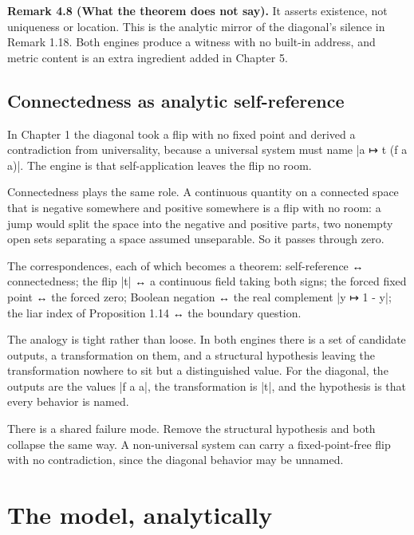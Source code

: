 \documentclass{memoir}
\begin{document}
\textbf{Remark 4.8 (What the theorem does not say).} It asserts existence, not uniqueness or
location. This is the analytic mirror of the diagonal's silence in Remark 1.18.
Both engines produce a witness with no built-in address, and metric content is
an extra ingredient added in Chapter 5.



\subsection{Connectedness as analytic self-reference}\label{Two--Schemas--of--Impossibility-005F-005F-005F--Machine--Checked--Limits--of--Trustworthy--Machine--Learning-005F-005F-005F--and--Why--They--Tighten--with--Capability----From--Logic--to--Analysis----A--topology--primer----Connectedness--as--analytic--self--reference}

In Chapter 1 the diagonal took a flip with no fixed point and derived a
contradiction from universality, because a universal system must name \LeanVerb|a ↦ t (f a a)|.
The engine is that self-application leaves the flip no room.

Connectedness plays the same role. A continuous quantity on a connected space
that is negative somewhere and positive somewhere is a flip with no room: a jump
would split the space into the negative and positive parts, two nonempty open
sets separating a space assumed unseparable. So it passes through zero.

The correspondences, each of which becomes a theorem: self-reference ↔
connectedness; the flip \LeanVerb|t| ↔ a continuous field taking both signs; the forced
fixed point ↔ the forced zero; Boolean negation ↔ the real complement \LeanVerb|y ↦ 1 - y|;
the liar index of Proposition 1.14 ↔ the boundary question.

The analogy is tight rather than loose. In both engines there is a set of
candidate outputs, a transformation on them, and a structural hypothesis leaving
the transformation nowhere to sit but a distinguished value. For the diagonal,
the outputs are the values \LeanVerb|f a a|, the transformation is \LeanVerb|t|, and the
hypothesis is that every behavior is named.

There is a shared failure mode. Remove the structural hypothesis and both
collapse the same way. A non-universal system can carry a fixed-point-free flip
with no contradiction, since the diagonal behavior may be unnamed.



\section{The model, analytically}\label{Two--Schemas--of--Impossibility-005F-005F-005F--Machine--Checked--Limits--of--Trustworthy--Machine--Learning-005F-005F-005F--and--Why--They--Tighten--with--Capability----From--Logic--to--Analysis----The--model-005F-005F-005F--analytically}
\end{document}
